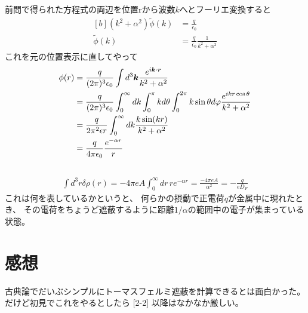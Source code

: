 \documentclass[../../master.tex]{subfiles}
\begin{document}
\subsection{}
前問で得られた方程式の両辺を位置rから波数\(k\)へとフーリエ変換すると
\begin{equation}\begin{aligned}[b]
    (k^2+\alpha^2)\tilde{\phi}(k) &= \frac{q}{\epsilon_0}\\
    \tilde{\phi}(k) &= \frac{q}{\epsilon_0}\frac{1}{k^2+\alpha^2}
\end{aligned}\end{equation}
これを元の位置表示に直してやって
\begin{equation}\begin{aligned}[b]
    \phi(r) &= \frac{q}{(2\pi)^3\epsilon_0}\int d^3 \vb*{k}
        \frac{e^{i \vb*{k}\cdot \vb*{r}}}{k^2+\alpha^2}\\
        &= \frac{q}{(2\pi)^3\epsilon_0}\int_0^\infty dk \int_0^\pi kd\theta \int_0^{2\pi} k\sin\theta d\varphi
        \frac{e^{i kr\cos\theta}}{k^2+\alpha^2}\\
        &= \frac{q}{2\pi^2\epsilon r}\int_{0}^{\infty} dk\frac{k\sin(kr)}{k^2+\alpha^2}\\
        &= \frac{q}{4\pi\epsilon_0}\frac{e^{-\alpha r}}{r}
\end{aligned}\end{equation}

\subsection{}
\begin{align}
    \int d^3r \delta \rho(r) = -4\pi eA \int_0^\infty dr\, re^{-\alpha r} =\frac{-4\pi eA}{\alpha^2}=-\frac{q}{eD_F}
\end{align}
これは何を表しているかというと、
何らかの摂動で正電荷\(q\)が金属中に現れたとき、
その電荷をちょうど遮蔽するように距離\(1/\alpha\)の範囲中の電子が集まっている状態。

\section*{感想}
古典論でだいぶシンプルにトーマスフェルミ遮蔽を計算できるとは面白かった。
だけど初見でこれをやるとしたら [2-2] 以降はなかなか厳しい。
\end{document}
